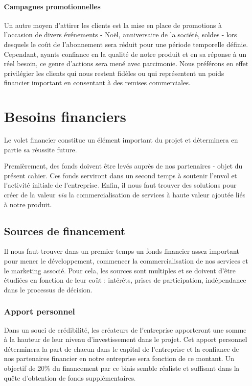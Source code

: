 \documentclass[10pt,twocolumn,a4paper,utf8x]{article}
\begin{document}
\paragraph{Campagnes promotionnelles}

Un autre moyen d'attirer les clients est la mise en place de promotions
à l'occasion de divers événements - Noël, anniversaire de la société,
soldes - lors desquels le coût de l'abonnement sera réduit pour une
période temporelle définie. Cependant, ayants confiance en la qualité de
notre produit et en sa réponse à un réel besoin, ce genre d'actions sera
mené avec parcimonie. Nous préférons en effet privilégier les clients
qui nous restent fidèles ou qui représentent un poids financier
important en consentant à des remises commerciales.

\section{Besoins financiers}

Le volet financier constitue un élément important du projet et
déterminera en partie sa réussite future.

Premièrement, des fonds doivent être levés auprès de nos partenaires -
objet du présent cahier. Ces fonds serviront dans un second temps à
soutenir l'envol et l'activité initiale de l'entreprise. Enfin, il nous
faut trouver des solutions pour créer de la valeur \emph{via} la
commercialisation de services à haute valeur ajoutée liés à notre
produit.

\subsection{Sources de financement}

Il nous faut trouver dans un premier temps un fonds financier assez
important pour mener le développement, commencer la commercialisation de
nos services et le marketing associé. Pour cela, les sources sont
multiples et se doivent d'être étudiées en fonction de leur coût :
intérêts, prises de participation, indépendance dans le processus de
décision.

\subsubsection{Apport personnel}

Dans un souci de crédibilité, les créateurs de l'entreprise apporteront
une somme à la hauteur de leur niveau d'investissement dans le projet.
Cet apport personnel déterminera la part de chacun dans le capital de
l'entreprise et la confiance de nos partenaires financier en notre
entreprise sera fonction de ce montant. Un objectif de 20\% du
financement par ce biais semble réaliste et suffisant dans la quête
d'obtention de fonds supplémentaires.
\end{document}

